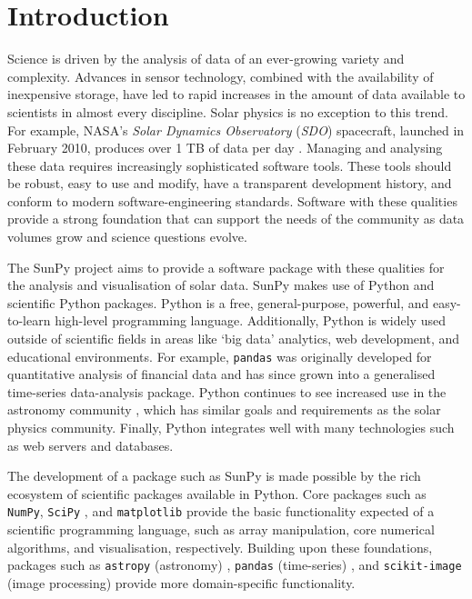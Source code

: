 \section{Introduction}\label{sec:Intro}

Science is driven by the analysis of data of an ever-growing variety and 
complexity. Advances in sensor technology, combined with the availability of 
inexpensive 
storage, have led to rapid increases in the amount of data available to scientists in almost
every discipline.  Solar physics is no exception to this trend. For example,
NASA's \textit{Solar Dynamics Observatory} (\textit{SDO}) spacecraft, launched
in February 2010, produces over 1 TB of data per day \cite{pesnell2012}. Managing and
analysing these data requires increasingly sophisticated software
tools. These tools should be robust, easy to use and modify, have a transparent
development history, and conform to modern software-engineering
standards. Software with these qualities provide a strong foundation that can support the
needs of the community as data volumes grow and science questions evolve.

The SunPy project aims to provide a software package with these qualities for 
the analysis and visualisation of solar data. SunPy makes
use of Python and scientific Python packages. Python is a free, general-purpose, 
powerful, and easy-to-learn high-level programming language. Additionally, Python is 
widely used outside of scientific fields in areas like `big data' analytics, web 
development, and educational environments. For example, \texttt{pandas} was 
originally developed for quantitative analysis of financial data and has since 
grown into a generalised time-series data-analysis package. Python continues to 
see increased use in the astronomy community \citep{greenfield2011}, which has 
similar goals and requirements as the solar physics community. Finally, Python 
integrates well with many technologies such as web servers \citep{dolgert2008} and databases. 

The development of a package such as SunPy is made possible by the rich ecosystem of 
scientific packages available in Python. Core packages such as \texttt{NumPy}, 
\texttt{SciPy} \citep{jones2001}, and \texttt{matplotlib} \citep{hunter2007} provide 
the basic functionality expected of a scientific programming language,
such as array manipulation, core numerical algorithms, and visualisation, respectively.
Building upon these foundations, packages such as \texttt{astropy} (astronomy)
\cite{theastropycollaboration2013}, \texttt{pandas} (time-series) 
\cite{mckinney2010, mckinney2012}, and \texttt{scikit-image} (image processing)
 \citep{vanderwalt2014} provide more domain-specific functionality.

